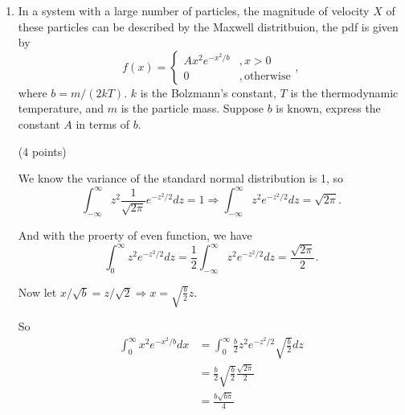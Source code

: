 \documentclass{article}\usepackage[]{graphicx}\usepackage[]{color}
\begin{document}
\begin{enumerate}
\begin{enumerate}
		{\bf Another answer:}
		If $X$ and $Y$ are in 1000s dollars as in the original question, then
		\[g(X) = \begin{cases}
		0 & , X \leq 0.5\\
		0.8(X - 0.5)& , 0.5 < X \leq 10.5\\
		X - 2.5 & , X > 10.5
		\end{cases}\]
		
		Then
		
		\begin{align*}
		E(Y ) & = E(g(X))\\
		& = \int_{0}^\infty g(x) f(x) dx\\
		& = \int_{0}^{0.5} 0 dx + \int_{0.5}^{10.5} 0.8(x - 0.5) \cdot 2.4(1 +x/2.5)^{-7} dx + \int_{10.5}^{\infty} (x - 2.5) \cdot 2.4(1 + x/2.5)^{-7} dx\\
		& = 0.1608
		\end{align*}
	\end{enumerate}

	\item 
	In a system with a large number of particles, the magnitude of velocity $X$ of these particles can be described by the Maxwell distritbuion, the pdf is given by
	\[f(x) = \begin{cases}
		 A x^2 e^{-x^2/b} & , x > 0\\
		 0 & , \mathrm{otherwise}
	\end{cases},\]
	where $b = m/(2kT)$. $k$ is the Bolzmann's constant, $T$ is the thermodynamic temperature, and $m$ is the particle mass. Suppose $b$ is known, express the constant $A$ in terms of $b$. 
	
	{\color{red} (4 points)
	
	We know the variance of the standard normal distribution is 1, so
	\[\int_{-\infty} ^{\infty} z^2 \frac{1}{\sqrt{2 \pi}}e^{-z^2/2} dz = 1 \Rightarrow \int_{-\infty}^{\infty} z^2 e^{-z^2/2} dz = \sqrt{2 \pi}.\]
	
	And with the proerty of even function, we have
	\[\int_{0}^{\infty} z^2 e^{-z^2/2} dz = \frac{1}{2} \int_{-\infty}^{\infty} z^2 e^{-z^2/2} dz = \frac{\sqrt{2 \pi}}{2}.\]
	
	Now let $x/\sqrt{b} = z/\sqrt{2} \Rightarrow x = \sqrt{\frac{b}{2}} z$.
	
	So
	\begin{align*}
	\int_{0}^\infty x^2 e^{-x^2/b} dx & = \int_{0}^\infty \frac{b}{2} z^2 e^{-z^2/2} \sqrt{\frac{b}{2}} dz\\
	& = \frac{b}{2} \sqrt{\frac{b}{2}} \frac{\sqrt{2 \pi}}{2}\\
	& = \frac{b\sqrt{b \pi}}{4}
	\end{align*}
	
}
\end{enumerate}
\end{document}
